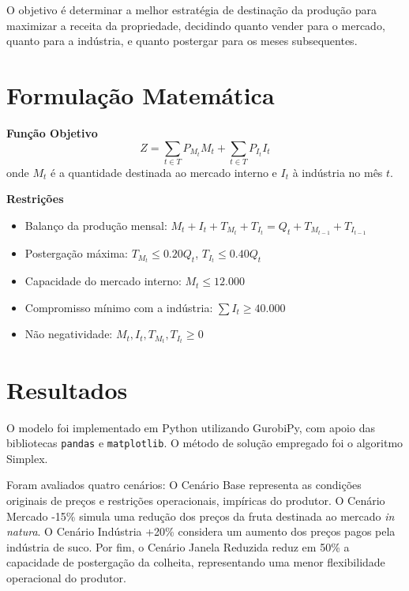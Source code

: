 \documentclass{wmecai}
\begin{document}
O objetivo é determinar a melhor estratégia de destinação da produção para maximizar a receita da propriedade, decidindo quanto vender para o mercado, quanto para a indústria, e quanto postergar para os meses subsequentes.

\section{Formulação Matemática}

\textbf{Função Objetivo}
\begin{equation}
Z = \sum_{t \in T} P_{M_t} M_t + \sum_{t \in T} P_{I_t} I_t
\end{equation}
onde $M_t$ é a quantidade destinada ao mercado interno e $I_t$ à indústria no mês $t$.

\vspace{0.2cm}
\textbf{Restrições}
\begin{itemize}
    \item Balanço da produção mensal: $M_t + I_t + T_{M_t} + T_{I_t} = Q_t + T_{M_{t-1}} + T_{I_{t-1}}$
    \item Postergação máxima: $T_{M_t} \leq 0.20 Q_t$, $T_{I_t} \leq 0.40 Q_t$
    \item Capacidade do mercado interno: $M_t \leq 12.000$
    \item Compromisso mínimo com a indústria: $\sum I_t \geq 40.000$
    \item Não negatividade: $M_t, I_t, T_{M_t}, T_{I_t} \geq 0$
\end{itemize}



\section{Resultados}
O modelo foi implementado em Python utilizando GurobiPy, com apoio das bibliotecas \texttt{pandas} e \texttt{matplotlib}. O método de solução empregado foi o algoritmo Simplex.


Foram avaliados quatro cenários: O Cenário Base representa as condições originais de preços e restrições operacionais, impíricas do produtor. O Cenário Mercado -15\% simula uma redução dos preços da fruta destinada ao mercado \textit{in natura}. O Cenário Indústria +20\% considera um aumento dos preços pagos pela indústria de suco. Por fim, o Cenário Janela Reduzida reduz em 50\% a capacidade de postergação da colheita, representando uma menor flexibilidade operacional do produtor.
\end{document}
